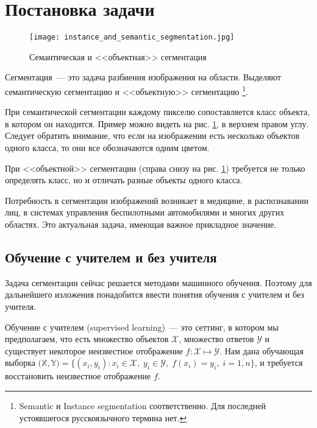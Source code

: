 \section{Постановка задачи}

\begin{figure}[h]
    \caption{Семантическая и <<объектная>> сегментация \label{fig:semantic_and_instance_segmentation}}
    \texttt{[image: instance\_and\_semantic\_segmentation.jpg]}
\end{figure}

Сегментация~--- это задача разбиения изображения на области.
Выделяют семантическую сегментацию и <<объектную>> сегментацию
\footnote{Semantic и Instance segmentation соответственно. Для последней устоявшегося русскоязычного термина нет.}.

При семантической сегментации каждому пикселю сопоставляется класс объекта, в котором он находится.
Пример можно видеть на рис. \ref{fig:semantic_and_instance_segmentation}, в верхнем правом углу.
Следует обратить внимание, что если на изображении есть несколько объектов одного класса, то они все обозначаются одним цветом.

При <<объектной>> сегментации (справа снизу на рис. \ref{fig:semantic_and_instance_segmentation}) требуется не только определять класс, но и отличать разные объекты одного класса.

Потребность в сегментации изображений возникает в медицине, в распознавании лиц, в системах управления беспилотными автомобилями и многих других областях.
Это актуальная задача, имеющая важное прикладное значение.

\subsection*{Обучение с учителем и без учителя}
Задача сегментации сейчас решается методами машинного обучения.
Поэтому для дальнейшего изложения понадобится ввести понятия обучения с учителем и без учителя.

Обучение с учителем (supervised learning)~--- это сеттинг, в котором мы предполагаем, что есть множество объектов $\mathcal{X}$,
множество ответов $\mathcal{Y}$ и существует некоторое неизвестное отображение $f\colon \mathcal{X} \mapsto \mathcal{Y}$.
Нам дана обучающая выборка $\bigl( \mathbb{X}, \mathbb{Y}\bigr) = \{ (x_i, y_i)\colon x_i \in \mathcal{X}, \; y_i \in \mathcal{Y}, \; f(x_i) = y_i, \; i = \overline{1, n}\}$,
и требуется восстановить неизвестное отображение $f$.

